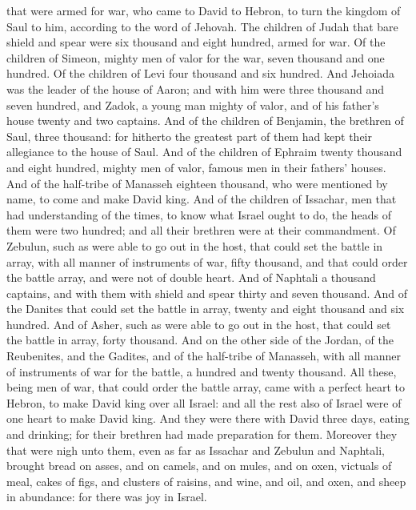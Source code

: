 that were armed for war, who came to David to Hebron, to turn the kingdom of Saul to him, according to the word of Jehovah. The children of Judah that bare shield and spear were six thousand and eight hundred, armed for war. Of the children of Simeon, mighty men of valor for the war, seven thousand and one hundred. Of the children of Levi four thousand and six hundred. And Jehoiada was the leader of the house of Aaron; and with him were three thousand and seven hundred, and Zadok, a young man mighty of valor, and of his father’s house twenty and two captains. And of the children of Benjamin, the brethren of Saul, three thousand: for hitherto the greatest part of them had kept their allegiance to the house of Saul. And of the children of Ephraim twenty thousand and eight hundred, mighty men of valor, famous men in their fathers’ houses. And of the half-tribe of Manasseh eighteen thousand, who were mentioned by name, to come and make David king. And of the children of Issachar, men that had understanding of the times, to know what Israel ought to do, the heads of them were two hundred; and all their brethren were at their commandment. Of Zebulun, such as were able to go out in the host, that could set the battle in array, with all manner of instruments of war, fifty thousand, and that could order the battle array, and were not of double heart. And of Naphtali a thousand captains, and with them with shield and spear thirty and seven thousand. And of the Danites that could set the battle in array, twenty and eight thousand and six hundred. And of Asher, such as were able to go out in the host, that could set the battle in array, forty thousand. And on the other side of the Jordan, of the Reubenites, and the Gadites, and of the half-tribe of Manasseh, with all manner of instruments of war for the battle, a hundred and twenty thousand.  All these, being men of war, that could order the battle array, came with a perfect heart to Hebron, to make David king over all Israel: and all the rest also of Israel were of one heart to make David king. And they were there with David three days, eating and drinking; for their brethren had made preparation for them. Moreover they that were nigh unto them, even as far as Issachar and Zebulun and Naphtali, brought bread on asses, and on camels, and on mules, and on oxen, victuals of meal, cakes of figs, and clusters of raisins, and wine, and oil, and oxen, and sheep in abundance: for there was joy in Israel. 

